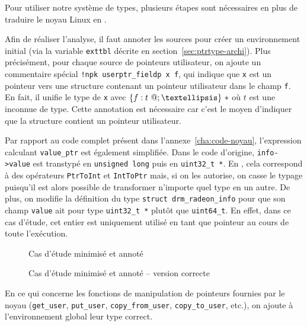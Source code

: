 Pour utiliser notre système de types, plusieurs étapes sont nécessaires en plus
de traduire le noyau Linux en \langname{}.

Afin de réaliser l'analyse, il faut annoter les sources pour créer un
environnement initial (via la variable \texttt{exttbl} décrite en
section~\ref{sec:ptrtype-archi}). Plus précisément, pour chaque source de
pointeurs utilisateur, on ajoute un commentaire spécial \texttt{!npk
userptr\_fieldp x f}, qui indique que \texttt{x} est un pointeur vers une
structure contenant un pointeur utilisateur dans le champ \texttt{f}. En fait,
il unifie le type de \texttt{x} avec $\{ f: \ptrU{t} ; … \}~*$ où $t$ est une
inconnue de type. Cette annotation est nécessaire car c'est le moyen d'indiquer
que la structure contient un pointeur utilisateur.

Par rapport au code complet présent dans l'annexe~\ref{cha:code-noyau},
l'expression calculant \texttt{value_ptr} est également simplifiée. Dans le code
d'origine, \texttt{info->value} est transtypé en \texttt{unsigned long} puis en
\texttt{uint32\_t *}. En \newspeak, cela correspond à des opérateurs
\texttt{PtrToInt} \linebreak et \texttt{IntToPtr} mais, si on les autorise, on
casse le typage puisqu'il est alors possible de transformer n'importe quel type
en un autre. De plus, on modifie la définition du type \texttt{struct
drm\_radeon\_info} pour que son champ \texttt{value} ait pour type
\texttt{uint32\_t *} plutôt que \texttt{uint64\_t}. En effet, dans ce cas
d'étude, cet entier est uniquement utilisé en tant que pointeur au cours de
toute l'exécution.

\begin{figure}[p]

\caption{Cas d'étude minimisé et annoté}
\label{fig:ex-drm}
\end{figure}

\begin{figure}[p]


    \caption{Cas d'étude minimisé et annoté -- version correcte}
    \label{fig:ex-drm-ok}

\end{figure}

En ce qui concerne les fonctions de manipulation de pointeurs fournies
par le noyau (\texttt{get\_user}, \texttt{put\_user},
\texttt{copy\_from\_user}, \texttt{copy\_to\_user}, etc.), on ajoute à
l'environnement global leur type correct.


